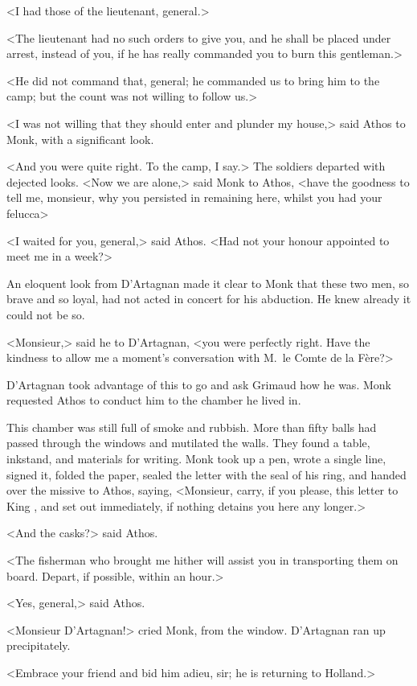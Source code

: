 <I had those of the lieutenant, general.>

<The lieutenant had no such orders to give you, and he shall be placed under arrest, instead of you, if he has really commanded you to burn this gentleman.>

<He did not command that, general; he commanded us to bring him to the camp; but the count was not willing to follow us.>

<I was not willing that they should enter and plunder my house,> said Athos to Monk, with a significant look.

<And you were quite right. To the camp, I say.> The soldiers departed with dejected looks. <Now we are alone,> said Monk to Athos, <have the goodness to tell me, monsieur, why you persisted in remaining here, whilst you had your felucca\longdash>

<I waited for you, general,> said Athos. <Had not your honour appointed to meet me in a week?>

An eloquent look from D'Artagnan made it clear to Monk that these two men, so brave and so loyal, had not acted in concert for his abduction. He knew already it could not be so.

<Monsieur,> said he to D'Artagnan, <you were perfectly right. Have the kindness to allow me a moment's conversation with M.~le Comte de la Fère?>

D'Artagnan took advantage of this to go and ask Grimaud how he was. Monk requested Athos to conduct him to the chamber he lived in.

This chamber was still full of smoke and rubbish. More than fifty balls had passed through the windows and mutilated the walls. They found a table, inkstand, and materials for writing. Monk took up a pen, wrote a single line, signed it, folded the paper, sealed the letter with the seal of his ring, and handed over the missive to Athos, saying, <Monsieur, carry, if you please, this letter to King , and set out immediately, if nothing detains you here any longer.>

<And the casks?> said Athos.

<The fisherman who brought me hither will assist you in transporting them on board. Depart, if possible, within an hour.>

<Yes, general,> said Athos.

<Monsieur D'Artagnan!> cried Monk, from the window. D'Artagnan ran up precipitately.

<Embrace your friend and bid him adieu, sir; he is returning to Holland.>

